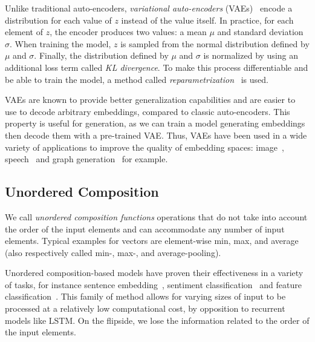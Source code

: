 Unlike traditional auto-encoders, \textit{variational auto-encoders} (VAEs)~\cite{vae:2013:kingma} encode a distribution for each value of $z$ instead of the value itself.
In practice, for each element of $z$, the encoder produces two values: a mean $\mu$ and standard deviation $\sigma$.
When training the model, $z$ is sampled from the normal distribution defined by $\mu$ and $\sigma$.
Finally, the distribution defined by $\mu$ and $\sigma$ is normalized by using an additional loss term called \textit{KL divergence}.
To make this process differentiable and be able to train the model, a method called \textit{reparametrization}~\cite{vae:2013:kingma} is used.

VAEs are known to provide better generalization capabilities and are easier to use to decode arbitrary embeddings, compared to classic auto-encoders.
This property is useful for generation, as we can train a model generating embeddings then decode them with a pre-trained VAE.
Thus, VAEs have been used in a wide variety of applications to improve the quality of embedding spaces: image~\cite{vae:2013:kingma}, speech~\cite{deep-metric-multispeaker:2020:kulkarni} and graph generation~\cite{graph-vae:2016:kipf} for example.


\subsection{Unordered Composition}
We call \textit{unordered composition functions} operations that do not take into account the order of the input elements and can accommodate any number of input elements.
Typical examples for vectors are element-wise min, max, and average (also respectively called min-, max-, and average-pooling).

Unordered composition-based models have proven their effectiveness in a variety of tasks, for instance sentence embedding~\cite{dan:2015:iyyer}, sentiment classification~\cite{adan:2016:chen} and feature classification~\cite{cdan:2017:gardner}.
This family of method allows for varying sizes of input to be processed at a relatively low computational cost, by opposition to recurrent models like LSTM.
On the flipside, we lose the information related to the order of the input elements.


